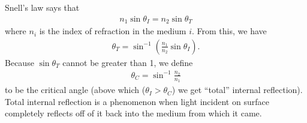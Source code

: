 \documentclass{report}
\theoremstyle{definition}
\newcommand{\f}[2]{\frac{#1}{#2}}
\newcommand{\lp}{\left(}
\newcommand{\rp}{\right)}
\begin{document}
\begin{itemize}
\begin{itemize}
		Snell's law says that
		\begin{align}
		n_1\sin\theta_I= n_2\sin\theta_T
		\end{align}
		where $n_i$ is the index of refraction in the medium $i$. From this, we have
		\begin{align}
		\theta_T = \sin^{-1}\lp \f{n_1}{n_2}\sin\theta_I \rp. 
		\end{align}
		Because $\sin\theta_T$ cannot be greater than 1, we define 
		\begin{align}
		\theta_C = \sin^{-1}\f{n_2}{n_1}
		\end{align}
		to be the critical angle (above which ($\theta_I > \theta_C$) we get ``total'' internal reflection). Total internal reflection is a phenomenon when light incident on surface completely reflects off of it back into the medium from which it came. 
		

\end{itemize}
\end{itemize}
\end{document}
